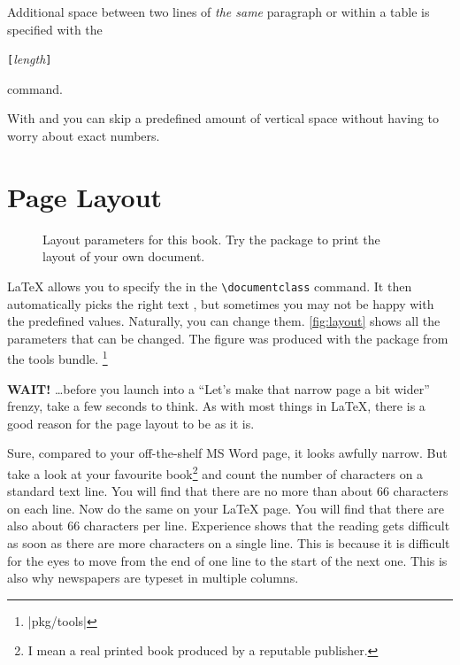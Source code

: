 Additional space between two lines of \emph{the same} paragraph or
within a table is specified with the
\begin{lscommand}
  \csi{\bs}\verb|[|\emph{length}\verb|]|
\end{lscommand}
\noindent command.

With  and  you can skip a predefined amount of
vertical space without having to worry about exact numbers.

\section{Page Layout}

\begin{figure}[!hp]
  \begin{center}
    \makeatletter\@mylayout\makeatother
  \end{center}
  \vspace*{1.8cm}
  \caption[Layout parameters for this book.]{Layout parameters for this book. Try the  package to print the layout of your own document.}\label{fig:layout}
\end{figure}

\LaTeX{} allows you to specify the  in the
\verb|\documentclass| command. It then automatically picks the right
text , but sometimes you may not be happy with
the predefined values. Naturally, you can change them.
\thispagestyle{fancyplain}
\autoref{fig:layout} shows all the parameters that can be changed.
The figure was produced with the  package from the tools bundle.%
\footnote{\CTANref|pkg/tools|}

\textbf{WAIT!} \ldots before you launch into a ``Let's make that
narrow page a bit wider'' frenzy, take a few seconds to think. As with
most things in \LaTeX, there is a good reason for the page layout to
be as it is.

Sure, compared to your off-the-shelf MS Word page, it looks awfully
narrow. But take a look at your favourite book\footnote{I mean a real
  printed book produced by a reputable publisher.} and count the number
of characters on a standard text line. You will find that there are no
more than about 66 characters on each line. Now do the same on your
\LaTeX{} page. You will find that there are also about 66 characters
per line.  Experience shows that the reading gets difficult as soon as
there are more characters on a single line. This is because it is
difficult for the eyes to move from the end of one line to the start of the next one.
This is also why newspapers are typeset in multiple columns.

